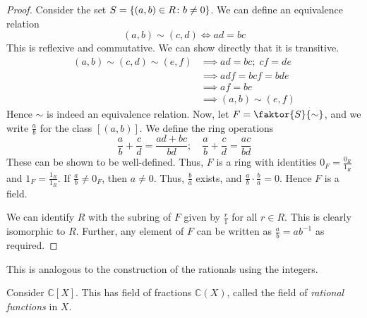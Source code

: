 \begin{proof}
	Consider the set \( S = \qty{(a,b) \in R \colon b \neq 0} \).
	We can define an equivalence relation
	\[
		(a,b) \sim (c,d) \iff ad = bc
	\]
	This is reflexive and commutative.
	We can show directly that it is transitive.
	\begin{align*}
		(a,b) \sim (c,d) \sim (e,f) & \implies ad = bc;\; cf = de \\
		                            & \implies adf = bcf = bde    \\
		                            & \implies af = be            \\
		                            & \implies (a,b) \sim (e,f)
	\end{align*}
	Hence \( \sim \) is indeed an equivalence relation.
	Now, let \( F = \faktor{S}{\sim} \), and we write \( \frac{a}{b} \) for the class \( [(a,b)] \).
	We define the ring operations
	\[
		\frac{a}{b} + \frac{c}{d} = \frac{ad + bc}{bd};\quad \frac{a}{b} + \frac{c}{d} = \frac{ac}{bd}
	\]
	These can be shown to be well-defined.
	Thus, \( F \) is a ring with identities \( 0_F = \frac{0_R}{1_R} \) and \( 1_F = \frac{1_R}{1_R} \).
	If \( \frac{a}{b} \neq 0_F \), then \( a \neq 0 \).
	Thus, \( \frac{b}{a} \) exists, and \( \frac{a}{b} \cdot \frac{b}{a} = 0 \).
	Hence \( F \) is a field.

	We can identify \( R \) with the subring of \( F \) given by \( \frac{r}{1} \) for all \( r \in R \).
	This is clearly isomorphic to \( R \).
	Further, any element of \( F \) can be written as \( \frac{a}{b} = ab^{-1} \) as required.
\end{proof}
This is analogous to the construction of the rationals using the integers.
\begin{example}
	Consider \( \mathbb C[X] \).
	This has field of fractions \( \mathbb C(X) \), called the field of \textit{rational functions} in \( X \).
\end{example}


